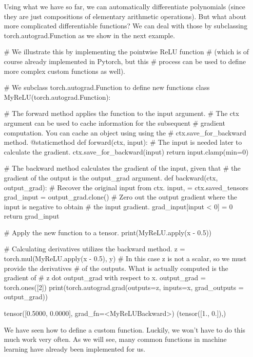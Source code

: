 Using what we have so far, we can automatically differentiate polynomials (since they are just compositions of elementary arithmetic operations). But what about more complicated differentiable functions? We can deal with those by subclassing torch.autograd.Function as we show in the next example.
\begin{python}
# We illustrate this by implementing the pointwise ReLU function
# (which is of course already implemented in Pytorch, but this
# process can be used to define more complex custom functions as well).

# We subclass torch.autograd.Function to define new functions
class MyReLU(torch.autograd.Function):
  
  # The forward method applies the function to the input argument.
  # The ctx argument can be used to cache information for the subsequent
  # gradient computation. You can cache an object using using the 
  # ctx.save_for_backward method.
  @staticmethod
  def forward(ctx, input):
    # The input is needed later to calculate the gradient.
    ctx.save_for_backward(input)
    return input.clamp(min=0)
  
  # The backward method calculates the gradient of the input, given that
  # the gradient of the output is the output_grad argument.
  def backward(ctx, output_grad):
    # Recover the original input from ctx.
    input, = ctx.saved_tensors
    grad_input = output_grad.clone()
    # Zero out the output gradient where the input is negative to obtain
    # the input gradient.
    grad_input[input < 0] = 0
    return grad_input
    
# Apply the new function to a tensor.
print(MyReLU.apply(x - 0.5))
    
# Calculating derivatives utilizes the backward method.
z = torch.mul(MyReLU.apply(x - 0.5), y)
# In this case z is not a scalar, so we must provide the derivatives
# of the outputs. What is actually computed is the gradient of 
# z dot output_grad with respect to x.
output_grad = torch.ones([2])
print(torch.autograd.grad(outputs=z, inputs=x, grad_outputs = output_grad))
\end{python}
\begin{python}
tensor([0.5000, 0.0000], grad_fn=<MyReLUBackward>)
(tensor([1., 0.]),)
\end{python}
We have seen how to define a custom function. Luckily, we won't have to do this much work very often. As we will see, many common functions in machine learning have already been implemented for us.

